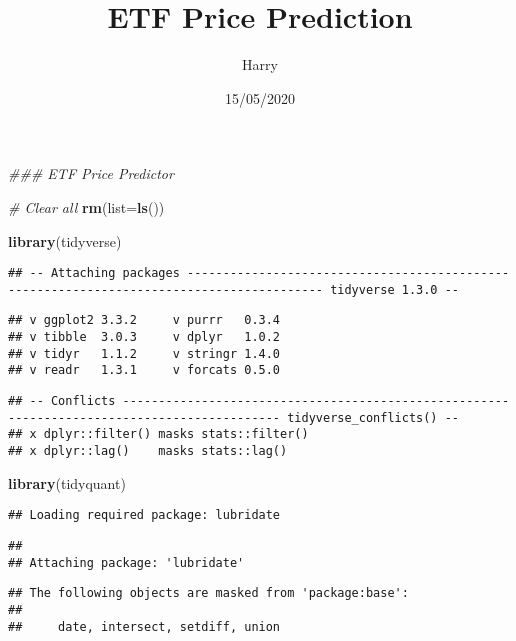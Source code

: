 \documentclass[
]{article}
\title{ETF Price Prediction}
\author{Harry}
\date{15/05/2020}
\newenvironment{Shaded}{\begin{snugshade}}{\end{snugshade}}
\newcommand{\CommentTok}[1]{\textcolor[rgb]{0.56,0.35,0.01}{\textit{#1}}}
\newcommand{\DataTypeTok}[1]{\textcolor[rgb]{0.13,0.29,0.53}{#1}}
\newcommand{\KeywordTok}[1]{\textcolor[rgb]{0.13,0.29,0.53}{\textbf{#1}}}
\newcommand{\NormalTok}[1]{#1}
\begin{document}
\maketitle

\begin{Shaded}
\begin{Highlighting}[]
\CommentTok{### ETF Price Predictor}

  \CommentTok{# Clear all}
    \KeywordTok{rm}\NormalTok{(}\DataTypeTok{list=}\KeywordTok{ls}\NormalTok{())}

    \KeywordTok{library}\NormalTok{(tidyverse)}
\end{Highlighting}
\end{Shaded}

\begin{verbatim}
## -- Attaching packages ----------------------------------------------------------------------------------------- tidyverse 1.3.0 --
\end{verbatim}

\begin{verbatim}
## v ggplot2 3.3.2     v purrr   0.3.4
## v tibble  3.0.3     v dplyr   1.0.2
## v tidyr   1.1.2     v stringr 1.4.0
## v readr   1.3.1     v forcats 0.5.0
\end{verbatim}

\begin{verbatim}
## -- Conflicts -------------------------------------------------------------------------------------------- tidyverse_conflicts() --
## x dplyr::filter() masks stats::filter()
## x dplyr::lag()    masks stats::lag()
\end{verbatim}

\begin{Shaded}
\begin{Highlighting}[]
    \KeywordTok{library}\NormalTok{(tidyquant)}
\end{Highlighting}
\end{Shaded}

\begin{verbatim}
## Loading required package: lubridate
\end{verbatim}

\begin{verbatim}
## 
## Attaching package: 'lubridate'
\end{verbatim}

\begin{verbatim}
## The following objects are masked from 'package:base':
## 
##     date, intersect, setdiff, union
\end{verbatim}
\end{document}
